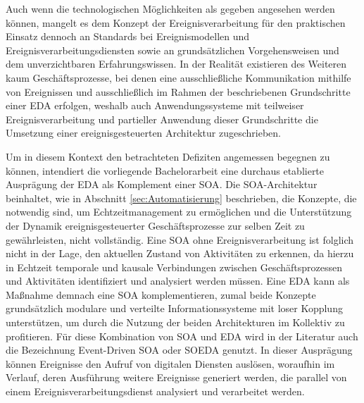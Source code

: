 Auch wenn die technologischen Möglichkeiten als gegeben angesehen werden können, mangelt es dem Konzept der Ereignisverarbeitung für den praktischen Einsatz dennoch an Standards bei Ereignismodellen und Ereignisverarbeitungsdiensten sowie an grundsätzlichen Vorgehensweisen und dem unverzichtbaren Erfahrungswissen. 
\cite{Etzion.2011}
In der Realität existieren des Weiteren kaum Geschäftsprozesse, bei denen eine ausschließliche Kommunikation mithilfe von Ereignissen und ausschließlich im Rahmen der beschriebenen Grundschritte einer \ac{EDA} erfolgen, weshalb auch Anwendungssysteme mit teilweiser Ereignisverarbeitung und partieller Anwendung dieser Grundschritte die Umsetzung einer ereignisgesteuerten Architektur zugeschrieben.
\cite{Etzion.2011}


Um in diesem Kontext den betrachteten Defiziten angemessen begegnen zu können, intendiert die vorliegende Bachelorarbeit eine durchaus etablierte Ausprägung der \ac{EDA} als Komplement einer \ac{SOA}.
Die \ac{SOA}-Architektur beinhaltet, wie in Abschnitt \ref{sec:Automatisierung} beschrieben, die Konzepte, die notwendig sind, um Echtzeitmanagement zu ermöglichen und die Unterstützung der Dynamik ereignisgesteuerter Geschäftsprozesse zur selben Zeit zu gewährleisten, nicht vollständig.
Eine \ac{SOA} ohne Ereignisverarbeitung ist folglich nicht in der Lage, den aktuellen Zustand von Aktivitäten zu erkennen, da hierzu in Echtzeit temporale und kausale Verbindungen zwischen Geschäftsprozessen und Aktivitäten identifiziert und analysiert werden müssen. 
Eine \ac{EDA} kann als Maßnahme demnach eine \ac{SOA} komplementieren, zumal beide Konzepte grundsätzlich modulare und verteilte Informationssysteme mit loser Kopplung unterstützen, um durch die Nutzung der beiden Architekturen im Kollektiv zu profitieren. 
Für diese Kombination von \ac{SOA} und \ac{EDA} wird in der Literatur auch die Bezeichnung Event-Driven SOA oder SOEDA genutzt.
\cite{Bruns.2010}
In dieser Ausprägung können Ereignisse den Aufruf von digitalen Diensten auslösen, woraufhin im Verlauf, deren Ausführung weitere Ereignisse generiert werden, die parallel von einem Ereignisverarbeitungsdienst analysiert und verarbeitet werden. 
\cite{Bruns.2010}